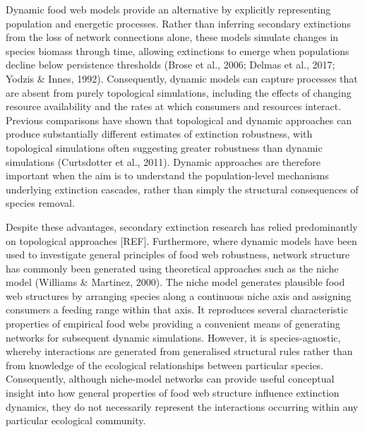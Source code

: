 \documentclass[
]{article}
\begin{document}
Dynamic food web models provide an alternative by explicitly
representing population and energetic processes. Rather than inferring
secondary extinctions from the loss of network connections alone, these
models simulate changes in species biomass through time, allowing
extinctions to emerge when populations decline below persistence
thresholds (Brose et al., 2006; Delmas et al., 2017; Yodzis \& Innes,
1992). Consequently, dynamic models can capture processes that are
absent from purely topological simulations, including the effects of
changing resource availability and the rates at which consumers and
resources interact. Previous comparisons have shown that topological and
dynamic approaches can produce substantially different estimates of
extinction robustness, with topological simulations often suggesting
greater robustness than dynamic simulations (Curtsdotter et al., 2011).
Dynamic approaches are therefore important when the aim is to understand
the population-level mechanisms underlying extinction cascades, rather
than simply the structural consequences of species removal.

Despite these advantages, secondary extinction research has relied
predominantly on topological approaches {[}REF{]}. Furthermore, where
dynamic models have been used to investigate general principles of food
web robustness, network structure has commonly been generated using
theoretical approaches such as the niche model (Williams \& Martinez,
2000). The niche model generates plausible food web structures by
arranging species along a continuous niche axis and assigning consumers
a feeding range within that axis. It reproduces several characteristic
properties of empirical food webs providing a convenient means of
generating networks for subsequent dynamic simulations. However, it is
species-agnostic, whereby interactions are generated from generalised
structural rules rather than from knowledge of the ecological
relationships between particular species. Consequently, although
niche-model networks can provide useful conceptual insight into how
general properties of food web structure influence extinction dynamics,
they do not necessarily represent the interactions occurring within any
particular ecological community.
\end{document}
